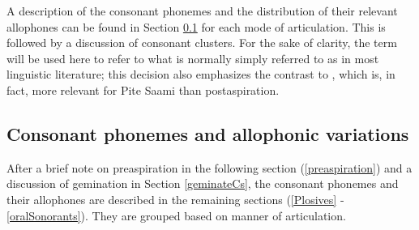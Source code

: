 A description of the consonant phonemes and the distribution of their relevant allophones can be found in Section \ref{Callophones} for each mode of articulation. 
This is followed by a discussion of consonant clusters. 
For the sake of clarity, the term  will be used here to refer to what is normally simply referred to as  in most linguistic literature; this decision also emphasizes the contrast to , which is, in fact, more relevant for Pite Saami than postaspiration.


\subsection{Consonant phonemes and allophonic variations}\label{Callophones}
After a brief note on preaspiration in the following section (\ref{preaspiration}) and a discussion of gemination in Section \ref{geminateCs}, the consonant phonemes and their allophones are described in the remaining sections (\ref{Plosives} - \ref{oralSonorants}). They are grouped based on manner of articulation.


